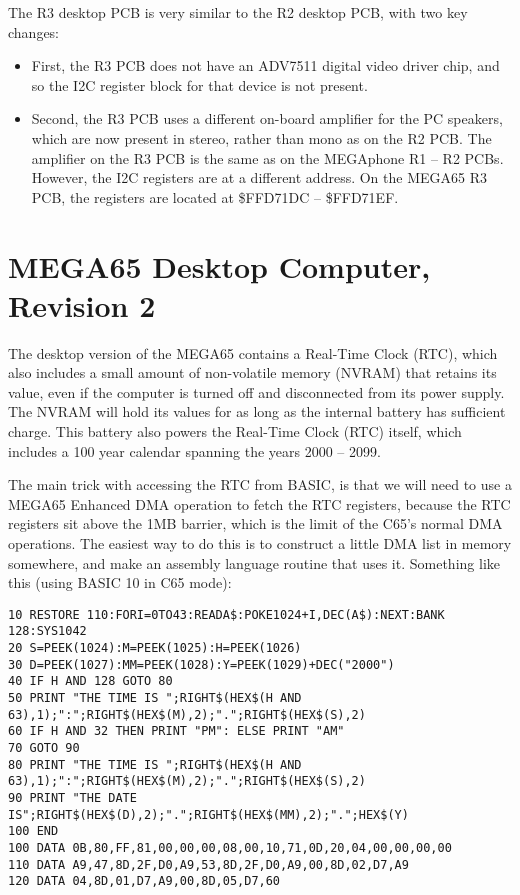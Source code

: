 The R3 desktop PCB is very similar to the R2 desktop PCB, with two key changes:

\begin{itemize}
\item First, the R3 PCB does not have an ADV7511 digital video driver chip, and so the I2C register block for that device is not present.
\item Second, the R3 PCB uses a different on-board amplifier for the PC speakers, which are now present in stereo, rather than mono
  as on the R2 PCB.  The amplifier on the R3 PCB is the same as on the MEGAphone R1 -- R2 PCBs.
  However, the I2C registers are at a different address.  On the MEGA65 R3 PCB, the registers are located at \$FFD71DC -- \$FFD71EF.
\end{itemize}

%


\section{MEGA65 Desktop Computer, Revision 2}

The desktop version of the MEGA65 contains a Real-Time Clock (RTC), which also includes a small amount of non-volatile memory (NVRAM)
that retains its value, even if the computer is turned off and disconnected from its power supply. The NVRAM will hold its values
for as long as the internal battery has sufficient charge.  This battery also powers the Real-Time Clock (RTC) itself, which includes
a 100 year calendar spanning the years 2000 -- 2099.

The main trick with accessing the RTC from BASIC, is that we will need to use a MEGA65 Enhanced DMA operation to fetch the RTC registers, because the RTC registers sit above the 1MB barrier, which is the limit of the C65's normal DMA operations.  The easiest way to do this is to construct a little DMA list in memory somewhere, and make an assembly language routine that uses it.  Something like this (using BASIC 10 in C65 mode):

\begin{tcolorbox}[colback=black,coltext=white]
\verbatimfont{\codefont}
\begin{verbatim}
10 RESTORE 110:FORI=0TO43:READA$:POKE1024+I,DEC(A$):NEXT:BANK 128:SYS1042
20 S=PEEK(1024):M=PEEK(1025):H=PEEK(1026)
30 D=PEEK(1027):MM=PEEK(1028):Y=PEEK(1029)+DEC("2000")
40 IF H AND 128 GOTO 80
50 PRINT "THE TIME IS ";RIGHT$(HEX$(H AND 63),1);":";RIGHT$(HEX$(M),2);".";RIGHT$(HEX$(S),2)
60 IF H AND 32 THEN PRINT "PM": ELSE PRINT "AM"
70 GOTO 90
80 PRINT "THE TIME IS ";RIGHT$(HEX$(H AND 63),1);":";RIGHT$(HEX$(M),2);".";RIGHT$(HEX$(S),2)
90 PRINT "THE DATE IS";RIGHT$(HEX$(D),2);".";RIGHT$(HEX$(MM),2);".";HEX$(Y)
100 END
100 DATA 0B,80,FF,81,00,00,00,08,00,10,71,0D,20,04,00,00,00,00
110 DATA A9,47,8D,2F,D0,A9,53,8D,2F,D0,A9,00,8D,02,D7,A9
120 DATA 04,8D,01,D7,A9,00,8D,05,D7,60
\end{verbatim}
\end{tcolorbox}


